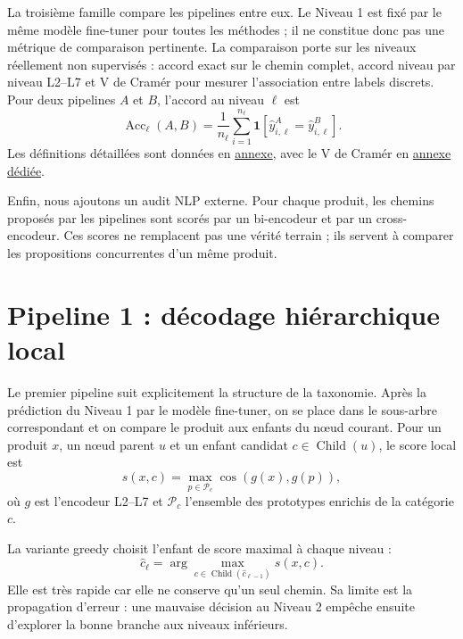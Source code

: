\documentclass[12pt,a4paper]{report}
\begin{document}
La troisième famille compare les pipelines entre eux. Le Niveau 1 est fixé par le même modèle fine-tuner pour toutes les méthodes ; il ne constitue donc pas une métrique de comparaison pertinente. La comparaison porte sur les niveaux réellement non supervisés : accord exact sur le chemin complet, accord niveau par niveau L2--L7 et V de Cramér pour mesurer l'association entre labels discrets. Pour deux pipelines $A$ et $B$, l'accord au niveau $\ell$ est
\begin{equation}
    \operatorname{Acc}_{\ell}(A,B)
    =
    \frac{1}{n_\ell}
    \sum_{i=1}^{n_\ell}
    \mathbf{1}
    \left[
    \hat{y}^{A}_{i,\ell}
    =
    \hat{y}^{B}_{i,\ell}
    \right].
\end{equation}
Les définitions détaillées sont données en \hyperref[sec:l2-l7-metrics-annex]{annexe}, avec le V de Cramér en \hyperref[sec:cramers-v-annex]{annexe dédiée}.

Enfin, nous ajoutons un audit NLP externe. Pour chaque produit, les chemins proposés par les pipelines sont scorés par un bi-encodeur et par un cross-encodeur. Ces scores ne remplacent pas une vérité terrain ; ils servent à comparer les propositions concurrentes d'un même produit.

\section{Pipeline 1 : décodage hiérarchique local}
\label{sec:l2-l7-pipeline1-local-decoding-main}

Le premier pipeline suit explicitement la structure de la taxonomie. Après la prédiction du Niveau 1 par le modèle fine-tuner, on se place dans le sous-arbre correspondant et on compare le produit aux enfants du nœud courant. Pour un produit $x$, un nœud parent $u$ et un enfant candidat $c\in\operatorname{Child}(u)$, le score local est
\begin{equation}
    s(x,c)
    =
    \max_{p\in\mathcal{P}_c}
    \cos(g(x),g(p)),
\end{equation}
où $g$ est l'encodeur L2--L7 et $\mathcal{P}_c$ l'ensemble des prototypes enrichis de la catégorie $c$.

La variante greedy choisit l'enfant de score maximal à chaque niveau :
\begin{equation}
    \hat{c}_{\ell}
    =
    \arg\max_{c\in\operatorname{Child}(\hat{c}_{\ell-1})}
    s(x,c).
\end{equation}
Elle est très rapide car elle ne conserve qu'un seul chemin. Sa limite est la propagation d'erreur : une mauvaise décision au Niveau 2 empêche ensuite d'explorer la bonne branche aux niveaux inférieurs.
\end{document}
